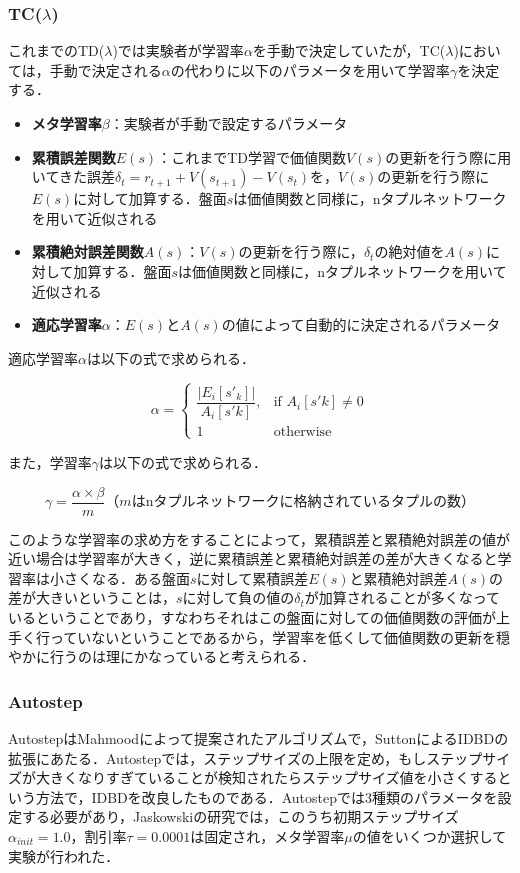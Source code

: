 \documentclass{suribt}
\begin{document}
\subsubsection{TC(${\lambda}$)}
これまでのTD(${\lambda}$)では実験者が学習率${\alpha}$を手動で決定していたが，TC(${\lambda}$)においては，手動で決定される${\alpha}$の代わりに以下のパラメータを用いて学習率${\gamma}$を決定する．

\begin{itemize}
\item \textbf{メタ学習率${\beta}$}：実験者が手動で設定するパラメータ
\item \textbf{累積誤差関数$E(s)$}：これまでTD学習で価値関数$V(s)$の更新を行う際に用いてきた誤差${\delta}_t = r_{t+1} + V(s_{t+1}) - V(s_t)$を，$V(s)$の更新を行う際に$E(s)$に対して加算する．盤面$s$は価値関数と同様に，nタプルネットワークを用いて近似される
\item \textbf{累積絶対誤差関数$A(s)$}：$V(s)$の更新を行う際に，${\delta}_t$の絶対値を$A(s)$に対して加算する．盤面$s$は価値関数と同様に，nタプルネットワークを用いて近似される
\item \textbf{適応学習率${\alpha}$}：$E(s)$と$A(s)$の値によって自動的に決定されるパラメータ
\end{itemize}

適応学習率${\alpha}$は以下の式で求められる．

\[
{\alpha} = 
\begin{cases}
\dfrac{|E_i[s'_k]|}{A_i[s'k]}, & \text{if $A_i[s'k] \neq 0$} \\
1 & \text{otherwise}
\end{cases}
\]

また，学習率${\gamma}$は以下の式で求められる．

\[
{\gamma} = \dfrac{{\alpha} \times {\beta}}{m} \text{（$m$はnタプルネットワークに格納されているタプルの数）}
\]

このような学習率の求め方をすることによって，累積誤差と累積絶対誤差の値が近い場合は学習率が大きく，逆に累積誤差と累積絶対誤差の差が大きくなると学習率は小さくなる．ある盤面$s$に対して累積誤差$E(s)$と累積絶対誤差$A(s)$の差が大きいということは，$s$に対して負の値の${\delta}_t$が加算されることが多くなっているということであり，すなわちそれはこの盤面に対しての価値関数の評価が上手く行っていないということであるから，学習率を低くして価値関数の更新を穏やかに行うのは理にかなっていると考えられる．

\subsubsection{Autostep}
AutostepはMahmoodによって提案されたアルゴリズムで，SuttonによるIDBDの拡張にあたる．Autostepでは，ステップサイズの上限を定め，もしステップサイズが大きくなりすぎていることが検知されたらステップサイズ値を小さくするという方法で，IDBDを改良したものである．Autostepでは3種類のパラメータを設定する必要があり，Jaskowskiの研究では，このうち初期ステップサイズ${\alpha}_{init} = 1.0$，割引率${\tau} = 0.0001$は固定され，メタ学習率${\mu}$の値をいくつか選択して実験が行われた．
\end{document}
